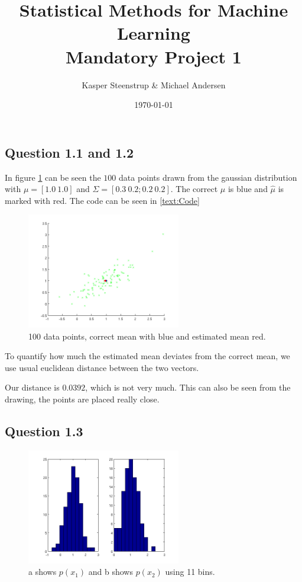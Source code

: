 \documentclass[a4paper, 10pt, final]{article}
\title{Statistical Methods for Machine Learning \\ Mandatory Project 1}
\author{Kasper Steenstrup \& Michael Andersen}
\date{\today}
\begin{document}
\maketitle

\subsection*{Question 1.1 and 1.2}

In figure \ref{fig:q1_1} can be seen the $100$ data points drawn from
the gaussian distribution with $\mu = [1.0~ 1.0]$ and $\Sigma = [0.3~
  0.2; 0.2~ 0.2]$. The correct $\mu$ is blue and $\widehat{\mu}$ is
marked with red. The code can be seen in \ref{text:Code}

\begin{figure}[!ht]
\centering
\includegraphics[width=0.6\textwidth]{images/q1_1}
\caption{100 data points, correct mean with blue and estimated mean red.}
\label{fig:q1_1}
\end{figure}

To quantify how much the estimated mean deviates from the correct
mean, we use usual euclidean distance between the two vectors.

Our distance is $0.0392$, which is not very much. This can also be
seen from the drawing, the points are placed really close.

\subsection*{Question 1.3}

\begin{figure}[!ht]
\centering
\includegraphics[width=0.6\textwidth]{images/q1_3a}
\caption{a shows $p(x_1)$ and b shows $p(x_2)$ using 11 bins.}
\label{fig:q1_3a}
\end{figure}
\end{document}
